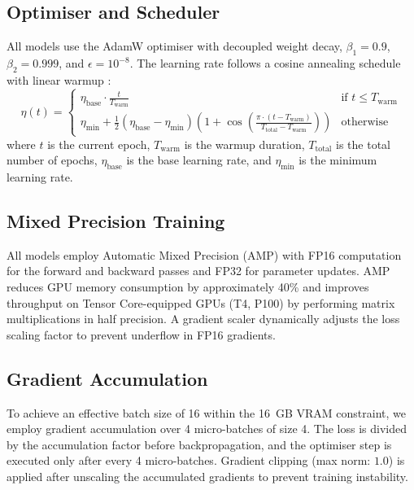 \subsection{Optimiser and Scheduler}

All models use the AdamW optimiser \cite{loshchilov2019adamw} with decoupled weight decay, $\beta_1 = 0.9$, $\beta_2 = 0.999$, and $\epsilon = 10^{-8}$. The learning rate follows a cosine annealing schedule with linear warmup \cite{loshchilov2017sgdr}:
\begin{equation}
    \eta(t) = \begin{cases}
        \eta_{\text{base}} \cdot \frac{t}{T_{\text{warm}}} & \text{if } t \leq T_{\text{warm}} \\[4pt]
        \eta_{\text{min}} + \frac{1}{2}(\eta_{\text{base}} - \eta_{\text{min}})\left(1 + \cos\left(\frac{\pi \cdot (t - T_{\text{warm}})}{T_{\text{total}} - T_{\text{warm}}}\right)\right) & \text{otherwise}
    \end{cases}
    \label{eq:cosine_warmup}
\end{equation}
where $t$ is the current epoch, $T_{\text{warm}}$ is the warmup duration, $T_{\text{total}}$ is the total number of epochs, $\eta_{\text{base}}$ is the base learning rate, and $\eta_{\text{min}}$ is the minimum learning rate.

\subsection{Mixed Precision Training}

All models employ Automatic Mixed Precision (AMP) \cite{micikevicius2018mixed} with FP16 computation for the forward and backward passes and FP32 for parameter updates. AMP reduces GPU memory consumption by approximately 40\% and improves throughput on Tensor Core-equipped GPUs (T4, P100) by performing matrix multiplications in half precision. A gradient scaler dynamically adjusts the loss scaling factor to prevent underflow in FP16 gradients.

\subsection{Gradient Accumulation}

To achieve an effective batch size of 16 within the 16~GB VRAM constraint, we employ gradient accumulation over 4 micro-batches of size 4. The loss is divided by the accumulation factor before backpropagation, and the optimiser step is executed only after every 4 micro-batches. Gradient clipping (max norm: $1.0$) is applied after unscaling the accumulated gradients to prevent training instability.

